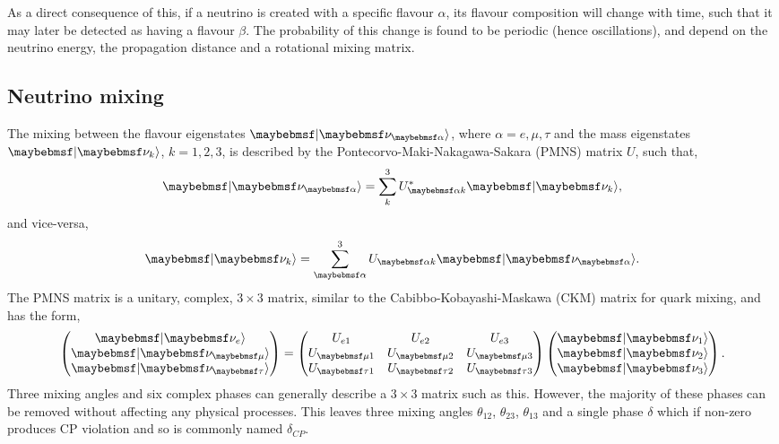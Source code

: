 As a direct consequence of this, if a neutrino is created with a specific flavour $\alpha$, its
flavour composition will change with time, such that it may later be detected as having a flavour
$\beta$. The probability of this change is found to be periodic (hence oscillations), and depend
on the neutrino energy, the propagation distance and a rotational mixing matrix.

\subsection{Neutrino mixing} %
\label{sec:theory_oscillations_mixing} %

The mixing between the flavour eigenstates $\ket{\nu_{\alpha}}$, where $\alpha=e,\mu,\tau$ and the
mass eigenstates $\ket{\nu_{k}}$, $k=1,2,3$, is described by the Pontecorvo-Maki-Nakagawa-Sakara
(PMNS) matrix $U$, such that,
\begin{equation} %
    \ket{\nu_{\alpha}}=\sum_{k}^{3}U_{\alpha k}^{*}\ket{\nu_{k}},
\end{equation}
and vice-versa,
\begin{equation} %
    \ket{\nu_{k}}=\sum_{\alpha}^{3}U_{\alpha k}\ket{\nu_{\alpha}}.
\end{equation}
The PMNS matrix is a unitary, complex, $3\times3$ matrix, similar to the Cabibbo-Kobayashi-Maskawa
(CKM) matrix for quark mixing, and has the form,
\begin{gather} %
    \begin{pmatrix}
        \ket{\nu_{e}}   \\
        \ket{\nu_{\mu}} \\
        \ket{\nu_{\tau}}
    \end{pmatrix}
    =
    \begin{pmatrix}
        U_{e1}     & U_{e2}     & U_{e3}     \\
        U_{\mu 1}  & U_{\mu 2}  & U_{\mu 3}  \\
        U_{\tau 1} & U_{\tau 2} & U_{\tau 3}
    \end{pmatrix}
    \begin{pmatrix}
        \ket{\nu_{1}} \\
        \ket{\nu_{2}} \\
        \ket{\nu_{3}}
    \end{pmatrix}.
\end{gather} %
Three mixing angles and six complex phases can generally describe a $3\times3$ matrix such as
this. However, the majority of these phases can be removed without affecting any physical
processes. This leaves three mixing angles $\theta_{12}$, $\theta_{23}$, $\theta_{13}$ and a
single phase $\delta$ which if non-zero produces CP violation and so is commonly named
$\delta_{CP}$.

